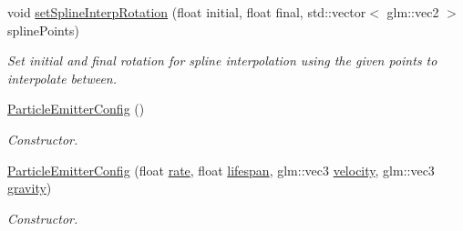 \begin{DoxyCompactItemize}
void \hyperlink{struct_mason_1_1_particle_emitter_config_abcaf3368ccf9b524538a3cf3fadb15d2}{set\+Spline\+Interp\+Rotation} (float initial, float final, std\+::vector$<$ glm\+::vec2 $>$ spline\+Points)
\begin{DoxyCompactList}\small\item\em Set initial and final rotation for spline interpolation using the given points to interpolate between. \end{DoxyCompactList}\item 
\hyperlink{struct_mason_1_1_particle_emitter_config_a317aa2e9d325160e20fd1bbefdc244f5}{Particle\+Emitter\+Config} ()
\begin{DoxyCompactList}\small\item\em Constructor. \end{DoxyCompactList}\item 
\hyperlink{struct_mason_1_1_particle_emitter_config_a50ce1e6e4420674c75b12b402ac5bf33}{Particle\+Emitter\+Config} (float \hyperlink{struct_mason_1_1_particle_emitter_config_abc0c7231f9134e3b0456d22ee8d5c8a2}{rate}, float \hyperlink{struct_mason_1_1_particle_emitter_config_a856b3906e25a7d41eb9bc7e37a91ef93}{lifespan}, glm\+::vec3 \hyperlink{struct_mason_1_1_particle_emitter_config_af8c3efa305e0a0636576bebe60938c80}{velocity}, glm\+::vec3 \hyperlink{struct_mason_1_1_particle_emitter_config_ad5fa0930e4e3f5d8c9de1324a854e63a}{gravity})
\begin{DoxyCompactList}\small\item\em Constructor. \end{DoxyCompactList}\end{DoxyCompactItemize}
